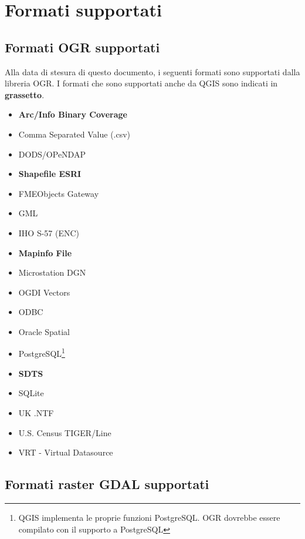 \section{Formati supportati}\label{appdx_data_formats}


\subsection{Formati OGR supportati}\label{appdx_ogr}

Alla data di stesura di questo documento, i seguenti formati sono supportati dalla libreria OGR. I formati che sono supportati anche da QGIS sono indicati in \textbf{grassetto}.

\begin{itemize}
\item \textbf{Arc/Info Binary Coverage}
\item Comma Separated Value (.csv) 
\item DODS/OPeNDAP
\item \textbf{Shapefile ESRI}
\item FMEObjects Gateway
\item GML
\item IHO S-57 (ENC)
\item \textbf{Mapinfo File}
\item Microstation DGN
\item OGDI Vectors
\item ODBC
\item Oracle Spatial
\item PostgreSQL\footnote{QGIS implementa le proprie funzioni PostgreSQL. OGR dovrebbe essere compilato con il supporto a PostgreSQL}
\item \textbf{SDTS}
\item SQLite
\item UK .NTF
\item U.S. Census TIGER/Line
\item VRT - Virtual Datasource
\end{itemize}

\subsection{Formati raster GDAL supportati}\label{appdx_gdal}

